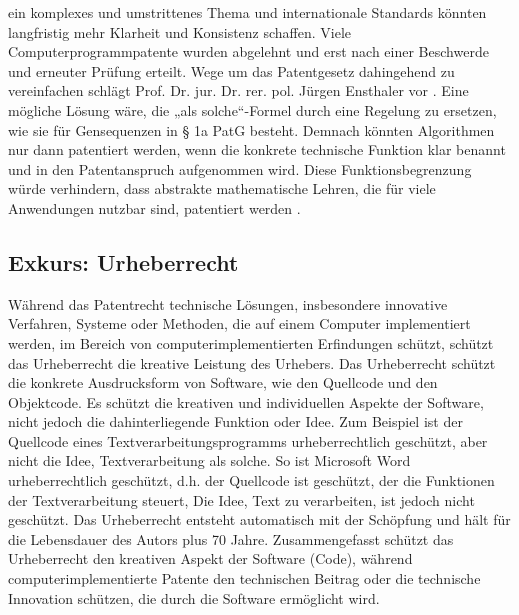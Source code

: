 ein komplexes und umstrittenes Thema 
und internationale Standards könnten 
langfristig mehr Klarheit und Konsistenz schaffen.
Viele Computerprogrammpatente wurden abgelehnt und erst nach 
einer Beschwerde und erneuter Prüfung erteilt.
Wege um das Patentgesetz dahingehend zu vereinfachen schlägt 
Prof. Dr. jur. Dr. rer. pol. Jürgen Ensthaler 
vor \cite{ensthalerEnsthalerBegrenzungPatentierung2013}. 
Eine mögliche Lösung wäre, die „als solche“-Formel durch eine Regelung zu ersetzen, 
wie sie für Gensequenzen in § 1a PatG besteht. 
Demnach könnten Algorithmen nur dann patentiert werden, 
wenn die konkrete technische Funktion klar benannt 
und in den Patentanspruch aufgenommen wird. 
Diese Funktionsbegrenzung würde verhindern, 
dass abstrakte mathematische Lehren, 
die für viele Anwendungen nutzbar sind, patentiert werden 
\cite{ensthalerEnsthalerBegrenzungPatentierung2013}. 
\subsection{Exkurs: Urheberrecht\label{sec:urh}}
Während das Patentrecht technische Lösungen, 
insbesondere innovative Verfahren, 
Systeme oder Methoden, die auf einem Computer implementiert werden,
im Bereich von computerimplementierten Erfindungen
schützt, schützt das Urheberrecht die kreative Leistung des Urhebers.
Das Urheberrecht schützt die konkrete Ausdrucksform von Software, 
wie den Quellcode und den Objektcode. 
Es schützt die kreativen und individuellen Aspekte der Software, 
nicht jedoch die dahinterliegende Funktion oder Idee.
Zum Beispiel ist
der Quellcode eines Textverarbeitungsprogramms
urheberrechtlich geschützt, 
aber nicht die Idee, Textverarbeitung als solche.
So ist Microsoft Word urheberrechtlich geschützt, d.h.
der Quellcode ist geschützt,
der die Funktionen der Textverarbeitung steuert,
Die Idee, Text zu verarbeiten, ist jedoch nicht geschützt.
Das Urheberrecht entsteht automatisch mit der Schöpfung 
und hält für die Lebensdauer des Autors plus 70 Jahre.
Zusammengefasst schützt das Urheberrecht den kreativen Aspekt der Software (Code), 
während computerimplementierte Patente 
den technischen Beitrag oder die technische Innovation schützen, 
die durch die Software ermöglicht wird.

